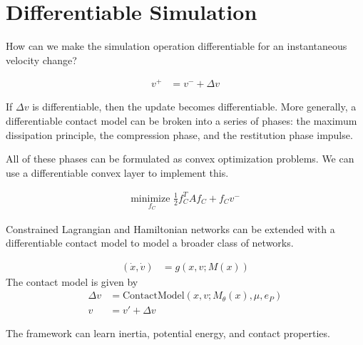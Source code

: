 \documentclass[book.tex]{subfiles}
\begin{document}
\section{Differentiable Simulation}

How can we make the simulation operation differentiable for an instantaneous velocity change?

\begin{align}
    v^+ &= v^- + \Delta v
\end{align}

If $\Delta v$ is differentiable, then the update becomes differentiable. More generally, a differentiable contact model can be broken into a series of phases: the maximum dissipation principle, the compression phase, and the restitution phase impulse.

All of these phases can be formulated as convex optimization problems. We can use a differentiable convex layer to implement this.

\begin{align}
\underset{f_C}{\textrm{minimize }} \frac{1}{2}f_C^T A  f_C + f_C v^-
\end{align}

Constrained Lagrangian and Hamiltonian networks can be extended with a differentiable contact model to model a broader class of networks. %

\begin{align}
(\dot{x}, \dot{v}) &= g(x, v; M(x))
\end{align}
The contact model is given by
\begin{align}
    \Delta v &= \textrm{ContactModel}(x, v; M_{\theta}(x), \mu, e_P) \\
    v&= v' + \Delta v
\end{align}

The framework can learn inertia, potential energy, and contact properties. %


\end{document}

